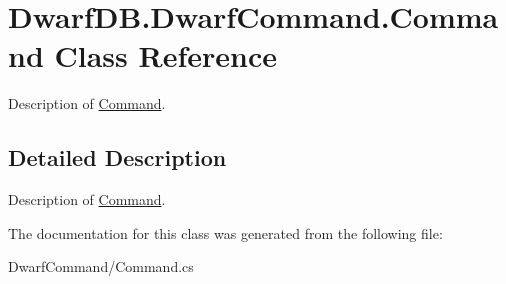 \hypertarget{class_dwarf_d_b_1_1_dwarf_command_1_1_command}{\section{Dwarf\+D\+B.\+Dwarf\+Command.\+Command Class Reference}
\label{class_dwarf_d_b_1_1_dwarf_command_1_1_command}
}


Description of \hyperlink{class_dwarf_d_b_1_1_dwarf_command_1_1_command}{Command}.  




\subsection{Detailed Description}
Description of \hyperlink{class_dwarf_d_b_1_1_dwarf_command_1_1_command}{Command}. 



The documentation for this class was generated from the following file\+:\begin{DoxyCompactItemize}
\item 
Dwarf\+Command/Command.\+cs\end{DoxyCompactItemize}
